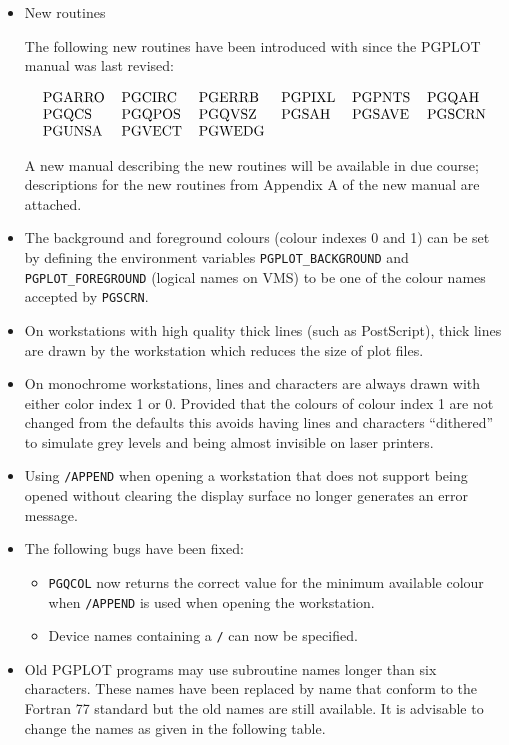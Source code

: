 \begin{itemize}
\item New routines

The following new routines have been introduced with since the PGPLOT manual
was last revised:

\[\begin{tabular}{llllll}
PGARRO &PGCIRC &PGERRB &PGPIXL &PGPNTS &PGQAH \\
PGQCS &PGQPOS &PGQVSZ &PGSAH &PGSAVE &PGSCRN \\
PGUNSA &PGVECT &PGWEDG
\end{tabular}\]

A new manual describing the new routines will be available
in due course; descriptions for the new routines from Appendix A
of the new manual are attached.

\item The background and foreground colours (colour indexes 0 and 1) can
be set by defining the environment variables {\tt PGPLOT\_BACKGROUND} and
{\tt PGPLOT\_FOREGROUND} (logical names on VMS) to be one of the colour names
accepted by {\tt PGSCRN}.

\item On workstations with high quality thick lines (such as PostScript), 
thick lines are drawn by the workstation which reduces the size of plot files.

\item On monochrome workstations, lines and characters are always drawn with
either color index 1 or 0. Provided that the colours of colour index 1 are 
not changed from the defaults this
avoids having lines and characters ``dithered'' to simulate grey levels
and being almost invisible on laser printers.

\item Using {\tt /APPEND} when opening a workstation that does not support
being opened without clearing the display surface no longer generates an
error message.

\item The following bugs have been fixed:
\begin{itemize}
\item {\tt PGQCOL} now returns the correct value for the minimum available
colour when {\tt /APPEND} is used when opening the workstation.

\item Device names containing a {\tt /} can now be specified.

\end{itemize}
\item Old PGPLOT programs may use subroutine names longer than six characters. These
names have been replaced by name that conform to the Fortran 77 standard but the
old names are still available. It is advisable to change the names as
given in the following table.


\end{itemize}
